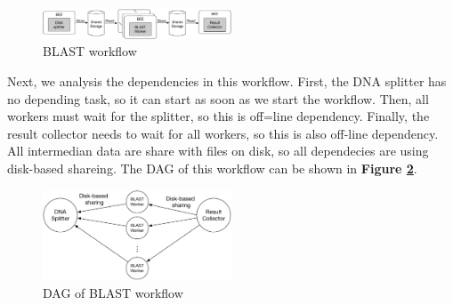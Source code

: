 \begin{figure}[h]
    \centering
    \caption{BLAST workflow}
    \label{blast-wf}
    \includegraphics[width=0.5\textwidth]{figures/blast.pdf}
\end{figure}    

Next, we analysis the dependencies in this workflow. First, the DNA splitter has no depending task, so it can start as soon as we start the workflow. Then, all workers must wait for the splitter, so this is off=line dependency. Finally, the result collector needs to wait for all workers, so this is also off-line dependency. All intermedian data are share with files on disk, so all dependecies are using disk-based shareing. The DAG of this workflow can be shown in \textbf{Figure \ref{blast-dag}}.

\begin{figure}[h]
    \centering
    \caption{DAG of BLAST workflow}
    \label{blast-dag}
    \includegraphics[width=0.5\textwidth]{figures/blast-dag.pdf}
\end{figure}



